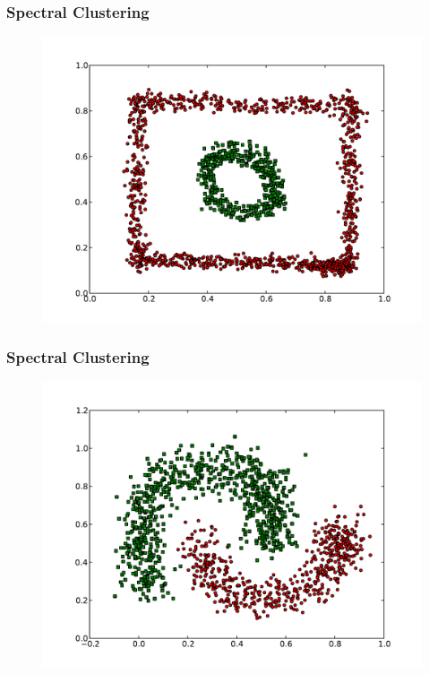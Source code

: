 \documentclass{beamer}
\begin{document}
\begin{frame}
\frametitle{Spectral Clustering}
    \begin{figure}[]
    \includegraphics[scale=0.3]{spectral_circle-weird.pdf}
    \end{figure}
\end{frame}

\begin{frame}
\frametitle{Spectral Clustering}
    \begin{figure}[]
    \includegraphics[scale=0.3]{spectral_half-moons.pdf}
    \end{figure}
\end{frame}
\end{document}
